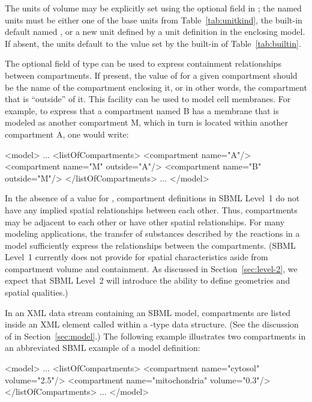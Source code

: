 \documentclass[10pt]{cekarticle}
\newcommand{\vref}[1]{\ref{#1}}
\begin{document}
The units of volume may be explicitly set using the optional field
 in ; the named units must be either one
of the base units from Table~\vref{tab:unitkind}, the built-in default
named , or a new unit defined by a unit definition in the
enclosing model.  If absent, the units default to the value set by the
built-in  of Table~\ref{tab:builtin}.

The optional field  of type  can be used to
express containment relationships between compartments.  If present, the
value of  for a given compartment should be the name of the
compartment enclosing it, or in other words, the compartment that is
``outside'' of it.  This facility can be used to model cell membranes.  For
example, to express that a compartment named B has a membrane that is
modeled as another compartment M, which in turn is located within another
compartment A, one would write:
\begin{example}
<model>
    ...
    <listOfCompartments>
        <compartment name="A"/>
        <compartment name="M" outside="A"/>
        <compartment name="B" outside="M"/>
    </listOfCompartments>
    ...
</model>
\end{example}

In the absence of a value for , compartment definitions in
SBML Level~1 do not have any implied spatial relationships between each
other.  Thus, compartments may be adjacent to each other or have other
spatial relationships.  For many modeling applications, the transfer of
substances described by the reactions in a model sufficiently express the
relationships between the compartments.  (SBML Level~1 currently does not
provide for spatial characteristics aside from compartment volume and
containment.  As discussed in Section~\ref{sec:level-2}, we expect that
SBML Level~2 will introduce the ability to define geometries and spatial
qualities.)

In an XML data stream containing an SBML model, compartments are listed
inside an XML element called  within a
-type data structure.  (See the discussion of  in
Section~\ref{sec:model}.)  The following example illustrates two
compartments in an abbreviated SBML example of a model definition:

\begin{example}
<model>
    ...
    <listOfCompartments>
        <compartment name="cytosol" volume="2.5"/>
        <compartment name="mitochondria" volume="0.3"/>
    </listOfCompartments>
    ...
</model>
\end{example}
\end{document}
